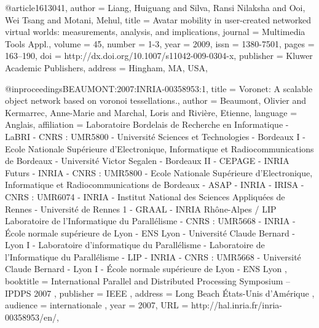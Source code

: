 @article{1613041,
 author = {Liang, Huiguang and Silva, Ransi Nilaksha and Ooi, Wei Tsang and Motani, Mehul},
 title = {Avatar mobility in user-created networked virtual worlds: measurements, analysis, and implications},
 journal = {Multimedia Tools Appl.},
 volume = {45},
 number = {1-3},
 year = {2009},
 issn = {1380-7501},
 pages = {163--190},
 doi = {http://dx.doi.org/10.1007/s11042-009-0304-x},
 publisher = {Kluwer Academic Publishers},
 address = {Hingham, MA, USA},
 }


@inproceedings{BEAUMONT:2007:INRIA-00358953:1,
	title = { {V}oronet: {A} scalable object network based on voronoi tessellations.},
	author = {{B}eaumont, {O}livier and {K}ermarrec, {A}nne-{M}arie and {M}archal, {L}oris and {R}ivi{\`e}re, {E}tienne},
	language = {{A}nglais},
	affiliation = {{L}aboratoire {B}ordelais de {R}echerche en {I}nformatique - {L}a{BRI} - {CNRS} : {UMR}5800 - {U}niversit{\'e} {S}ciences et {T}echnologies - {B}ordeaux {I} - {E}cole {N}ationale {S}up{\'e}rieure d'{E}lectronique, {I}nformatique et {R}adiocommunications de {B}ordeaux - {U}niversit{\'e} {V}ictor {S}egalen - {B}ordeaux {II} - {CEPAGE} - {INRIA} {F}uturs - {INRIA} - {CNRS} : {UMR}5800 - {E}cole {N}ationale {S}up{\'e}rieure d'{E}lectronique, {I}nformatique et {R}adiocommunications de {B}ordeaux - {ASAP} - {INRIA} - {IRISA} - {CNRS} : {UMR}6074 - {INRIA} - {I}nstitut {N}ational des {S}ciences {A}ppliqu{\'e}es de {R}ennes - {U}niversit{\'e} de {R}ennes 1 - {GRAAL} - {INRIA} {R}h{\^o}ne-{A}lpes / {LIP} {L}aboratoire de l'{I}nformatique du {P}arall{\'e}lisme - {CNRS} : {UMR}5668 - {INRIA} - {\'E}cole normale sup{\'e}rieure de {L}yon - {ENS} {L}yon - {U}niversit{\'e} {C}laude {B}ernard - {L}yon {I} - {L}aboratoire d'informatique du {P}arall{\'e}lisme - {L}aboratoire de l'{I}nformatique du {P}arall{\'e}lisme - {LIP} - {INRIA} - {CNRS} : {UMR}5668 - {U}niversit{\'e} {C}laude {B}ernard - {L}yon {I} - {\'E}cole normale sup{\'e}rieure de {L}yon - {ENS} {L}yon },
	booktitle = {{I}nternational {P}arallel and {D}istributed {P}rocessing {S}ymposium -- {IPDPS} 2007 },
	publisher = {{IEEE} },
	address = {{L}ong {B}each {\'E}tats-{U}nis d'{A}m{\'e}rique },
	audience = {internationale },
    year = {2007},
    URL = {http://hal.inria.fr/inria-00358953/en/},
}

